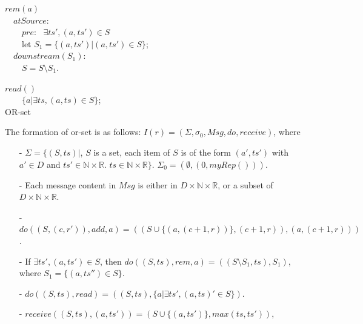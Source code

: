 {\begin{algorithm}[H]
$rem(a)$ \\
\ \ $\mathit{atSource}$: \\
\ \ \ \ $\mathit{pre}$: \ $\exists \mathit{ts}', (a,\mathit{ts}') \in S$ \\
\ \ \ \ let $S_1 = \{ (a,\mathit{ts}') \vert (a,\mathit{ts}') \in S \}$; \\

\ \ $\mathit{downstream}(S_1)$: \\
\ \ \ \ $S = S \setminus S_1$.

$read()$ \\
\ \ \ \ \KwRet $\{ a \vert \exists \mathit{ts}, (a,\mathit{ts}) \in S \}$; \\

\caption{OR-set}
\label{Method-or-set}
\end{algorithm}


The formation of or-set is as follows: $I(r) = (\Sigma, \sigma_0, \mathit{Msg}, \mathit{do},\mathit{receive})$, where

\begin{itemize}
\setlength{\itemsep}{0.5pt}
\item[-] $\Sigma = \{ (S,\mathit{ts}) \vert$, $S$ is a set, each item of $S$ is of the form $(a',\mathit{ts}')$ with $a' \in D$ and $\mathit{ts}' \in \mathbb{N} \times \mathbb{R}.$ $\mathit{ts} \in \mathbb{N} \times \mathbb{R} \}$. $\Sigma_0 = (\emptyset,(0,\mathit{myRep}()))$.

\item[-] Each message content in $\mathit{Msg}$ is either in $D \times \mathbb{N} \times \mathbb{R}$, or a subset of $D \times \mathbb{N} \times \mathbb{R}$.

\item[-] $\mathit{do}((S,(c,r')),\mathit{add},a) = ((S \cup \{ (a, (c+1,r)) \}, (c+1,r)),(a,(c+1,r)))$.

\item[-] If $\exists \mathit{ts}', (a,\mathit{ts}') \in S$, then $\mathit{do}((S,\mathit{ts}),\mathit{rem},a) = ((S \setminus S_1,\mathit{ts}), S_1)$, where $S_1 = \{ (a,\mathit{ts}'') \in S \}$.

\item[-] $\mathit{do}((S,\mathit{ts}),\mathit{read}) = ((S,\mathit{ts}),\{ a \vert \exists \mathit{ts}', (a,\mathit{ts})' \in S \})$.

\item[-] $\mathit{receive}((S,\mathit{ts}),(a,\mathit{ts}')) = (S \cup \{ (a,\mathit{ts}') \}, \mathit{max}( \mathit{ts},\mathit{ts}' ))$,


\end{itemize}}
